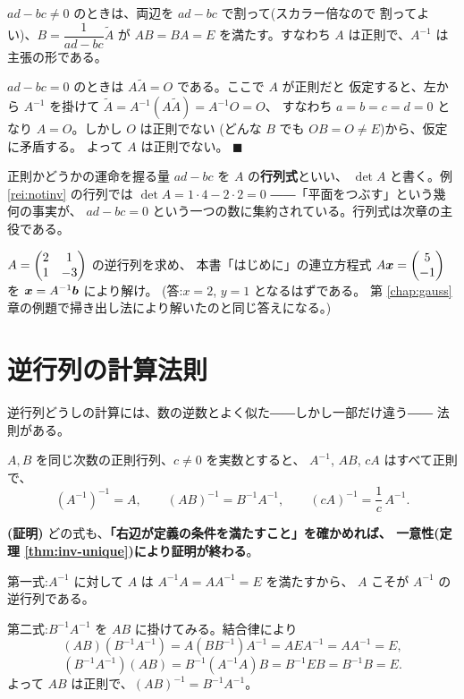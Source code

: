 $ad - bc \neq 0$ のときは、両辺を $ad - bc$ で割って(スカラー倍なので
割ってよい)、$B = \dfrac{1}{ad - bc}\widetilde{A}$ が
$AB = BA = E$ を満たす。すなわち $A$ は正則で、$A^{-1}$ は主張の形である。

$ad - bc = 0$ のときは $A\widetilde{A} = O$ である。ここで $A$ が正則だと
仮定すると、左から $A^{-1}$ を掛けて
$\widetilde{A} = A^{-1}(A\widetilde{A}) = A^{-1}O = O$、
すなわち $a = b = c = d = 0$ となり $A = O$。しかし $O$ は正則でない
(どんな $B$ でも $OB = O \neq E$)から、仮定に矛盾する。
よって $A$ は正則でない。 $\blacksquare$

正則かどうかの運命を握る量 $ad - bc$ を $A$ の\textbf{行列式}といい、
$\det A$ と書く。例 \ref{rei:notinv} の行列では
$\det A = 1 \cdot 4 - 2 \cdot 2 = 0$ ――「平面をつぶす」という幾何の事実が、
$ad - bc = 0$ という一つの数に集約されている。行列式は次章の主役である。

\begin{mondai}\label{q:inv2}    %
$A = \begin{pmatrix}2 & 1 \\ 1 & -3\end{pmatrix}$ の逆行列を求め、
本書「はじめに」の連立方程式 $A\bm{x} = \begin{pmatrix}5 \\ -1\end{pmatrix}$ を
$\bm{x} = A^{-1}\bm{b}$ により解け。
(答:$x = 2$, $y = 1$ となるはずである。
第 \ref{chap:gauss} 章の例題で掃き出し法により解いたのと同じ答えになる。)
\end{mondai}

\section{逆行列の計算法則}

逆行列どうしの計算には、数の逆数とよく似た――しかし一部だけ違う――
法則がある。

\begin{teiri}[逆行列の計算法則]\label{thm:inv-rules}
$A, B$ を同じ次数の正則行列、$c \neq 0$ を実数とすると、
$A^{-1}$, $AB$, $cA$ はすべて正則で、
\[
(A^{-1})^{-1} = A, \qquad
(AB)^{-1} = B^{-1}A^{-1}, \qquad
(cA)^{-1} = \frac{1}{c}\,A^{-1}.
\]
\end{teiri}

\noindent\textbf{(証明)}\quad
どの式も、\textbf{「右辺が定義の条件を満たすこと」を確かめれば、
一意性(定理 \ref{thm:inv-unique})により証明が終わる}。

第一式:$A^{-1}$ に対して $A$ は $A^{-1}A = AA^{-1} = E$ を満たすから、
$A$ こそが $A^{-1}$ の逆行列である。

第二式:$B^{-1}A^{-1}$ を $AB$ に掛けてみる。結合律により
\[
(AB)(B^{-1}A^{-1}) = A(BB^{-1})A^{-1} = AEA^{-1} = AA^{-1} = E,
\]
\[
(B^{-1}A^{-1})(AB) = B^{-1}(A^{-1}A)B = B^{-1}EB = B^{-1}B = E.
\]
よって $AB$ は正則で、$(AB)^{-1} = B^{-1}A^{-1}$。

